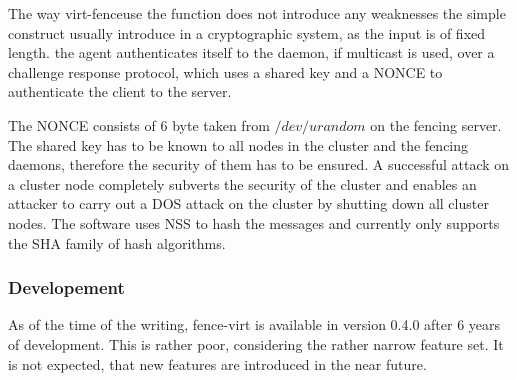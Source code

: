 The way virt-fenceuse the function does not introduce any weaknesses the simple construct
usually introduce in a cryptographic system, as the input is of fixed length.
the agent authenticates itself to the daemon, if multicast is used,
over a challenge response protocol, which uses a shared key and a \ac{NONCE}
to authenticate the client to the server. 

The \ac{NONCE} consists of 6 byte taken from $/dev/urandom$
on the fencing server. The shared key has to be known to
all nodes in the cluster and the fencing daemons, therefore the
security of them has to be ensured. A successful attack on a cluster node
completely subverts the security of the cluster and enables an
attacker to carry out a DOS attack on the cluster by shutting down
all cluster nodes. The software uses \ac{NSS} to hash the messages
and currently only supports the \ac{SHA} family of hash algorithms.


\subsubsection{Developement}
As of the time of the writing, fence-virt is available in version 0.4.0 after
6 years of development. This is rather poor, considering the rather narrow feature
set. It is not expected, that new features are introduced in the near future.
